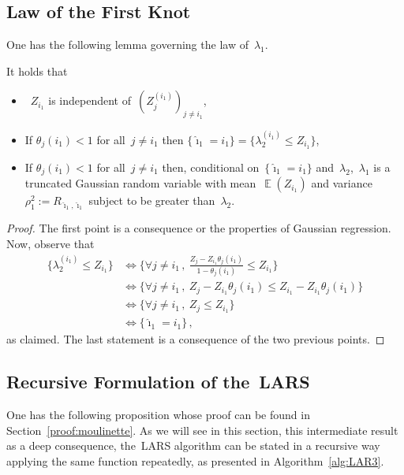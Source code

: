 \documentclass[final,numbib]{imaiai}%
\numberwithin{equation}{section}
\DeclareMathOperator*{\argmax}{arg\, max}
\newcommand{\E}{\operatorname{\mathds{E}}}
\renewcommand{\hat}{\widehat}
\def\\bUnif{\text{\bUnif}}
\newcommand{\<}{\langle}
\renewcommand{\>}{\rangle}
\newcommand{\1}{\mathds{1}}
\begin{document}
{\subsection{Law of the First Knot}
One has the following lemma governing the law of~$\lambda_1$.
\begin{lemma}
\label{lem:FirstKnotLaw}
It holds that 
\begin{itemize}
\item~$Z_{i_1}$ is independent of~$(Z_j^{(i_1)})_{j\neq i_1}$,%
\item If 
$\theta_j(i_1)<1$ for all~$j\neq i_1$ then $\big\{\hat \imath_1=i_1\big\}=\big\{\lambda_2^{(i_1)}\leq Z_{i_1}\big\}$,
\item If 
$\theta_j(i_1)<1$ for all~$j\neq i_1$ then, conditional on~$\{\hat \imath_1=i_1\}$ and~$\lambda_2$,~$\lambda_1$ is a truncated Gaussian random variable with mean~$\E(Z_{i_1})$ and variance~$\rho_1^2:=R_{\hat \imath_1,\hat \imath_1}$ subject to be greater than~$\lambda_2$.
\end{itemize}
\end{lemma}
\begin{proof}
The first point is  a consequence or the properties of Gaussian regression. Now, observe that 
\begin{align*}
\big\{\lambda_2^{(i_1)}\leq Z_{i_1}\big\}&\Leftrightarrow\big\{\forall j\neq i_1\,,\ \frac{Z_j-Z_{i_1}\theta_j(i_1)}{1-\theta_j(i_1)}\leq Z_{i_1}\big\}\\
&\Leftrightarrow\big\{\forall j\neq i_1\,,\ {Z_j-Z_{i_1}\theta_j(i_1)}\leq Z_{i_1}-Z_{i_1}\theta_j(i_1)\big\}\\
&\Leftrightarrow\big\{\forall j\neq i_1\,,\ {Z_j}\leq Z_{i_1}\big\}\\
&\Leftrightarrow\big\{\hat \imath_1=i_1\big\}\,,
\end{align*}
as claimed. The last statement is a consequence of the two previous points.
\end{proof}

\subsection{Recursive Formulation of the~LARS}
One has the following proposition whose proof can be found in Section~\ref{proof:moulinette}. As we will see in this section, this intermediate result as a deep consequence, the~LARS algorithm can be stated in a recursive way applying the same function repeatedly, as presented in Algorithm~\ref{alg:LAR3}. 

}
\end{document}
